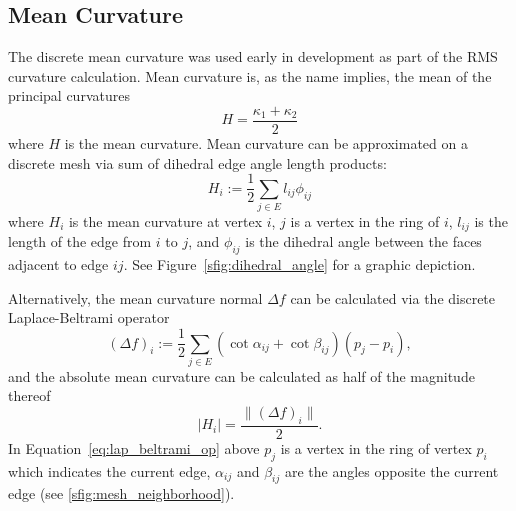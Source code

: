 \subsection{Mean Curvature}\label{sec:mean_k}
The discrete mean curvature was used early in development as part of the RMS curvature calculation.
Mean curvature is, as the name implies, the mean of the principal curvatures~\cite{DDGAppIntro_19_discrete_k_2}
\begin{equation}\label{eq:mean_k}
	H = \frac{\kappa_1 + \kappa_2}{2}
\end{equation}
where $H$ is the mean curvature.
Mean curvature can be approximated on a discrete mesh via sum of dihedral edge angle length products:
\begin{equation}\label{eq:dihedral_angle}
	H_i := \frac{1}{2}\sum_{j \in E}l_{ij} \phi_{ij}
\end{equation}
where $H_i$ is the mean curvature at vertex $i$, $j$ is a vertex in the ring of $i$, $l_{ij}$ is the length of the edge from $i$ to $j$, and $\phi_{ij}$ is the dihedral angle between the faces adjacent to edge $ij$.
See Figure~\ref{sfig:dihedral_angle} for a graphic depiction.

Alternatively, the mean curvature normal $\Delta f$ can be calculated via the discrete Laplace-Beltrami operator~\cite{DDGAppIntro_18_discrete_k_1}
\begin{equation}\label{eq:lap_beltrami_op}
	(\Delta f)_i := \frac{1}{2}\sum_{j \in E}(\cot \alpha_{ij} + \cot \beta_{ij})(p_j - p_i),
\end{equation}
and the absolute mean curvature can be calculated as half of the magnitude thereof
\begin{equation}
	|H_i| = \frac{\|(\Delta f)_i \|}{2}.
\end{equation}
In Equation~\ref{eq:lap_beltrami_op} above $p_j$ is a vertex in the ring of vertex $p_i$ which indicates the current edge, $\alpha_{ij}$ and $\beta_{ij}$ are the angles opposite the current edge (see \ref{sfig:mesh_neighborhood}).

